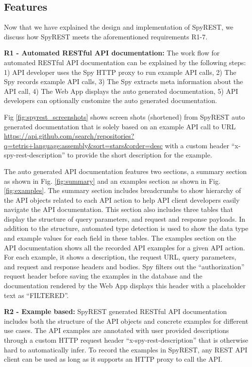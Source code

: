 \subsection{Features} %

Now that we have explained the design and implementation of SpyREST, we discuss how SpyREST meets the aforementioned requirements R1-7.

\textbf{R1 - Automated RESTful API documentation:} The work flow for automated RESTful API documentation can be explained by the following steps: 1) API developer uses the Spy HTTP proxy to run example API calls, 2) The Spy records example API calls, 3) The Spy extracts meta information about the API call, 4) The Web App displays the auto generated documentation, 5) API developers can optionally customize the auto generated documentation.

Fig \ref{fig:spyrest_screenshots} shows screen shots (shortened) from SpyREST auto generated documentation that is solely based on an example API call to URL \url{https://api.github.com/search/repositories?q=tetris+language:assembly&sort=stars&order=desc} with a custom header ``x-spy-rest-description'' to provide the short description for the example.

The auto generated API documentation features two sections, a summary section as shown in Fig. \ref{fig:summary} and an examples section as shown in Fig. \ref{fig:examples}. The summary section includes breadcrumbs to show hierarchy of the API objects related to each API action to help API client developers easily navigate the API documentation. This section also includes three tables that display the structure of query parameters, and request and response payloads. In addition to the structure, automated type detection is used to show the data type and example values for each field in these tables. The examples section on the API documentation shows all the recorded API examples for a given API action. For each example, it shows a description, the request URL, query parameters, and request and response headers and bodies. Spy filters out the ``authorization'' request header before saving the examples in the database and the documentation rendered by the Web App displays this header with a placeholder text as ``FILTERED''.

\textbf{R2 - Example based:} SpyREST generated RESTful API documentation includes both the structure of the API objects and concrete examples for different use cases. The API examples are annotated with user provided descriptions through a custom HTTP request header ``x-spy-rest-description'' that is otherwise hard to automatically infer. To record the examples in SpyREST, any REST API client can be used as long as it supports an HTTP proxy to call the API.

